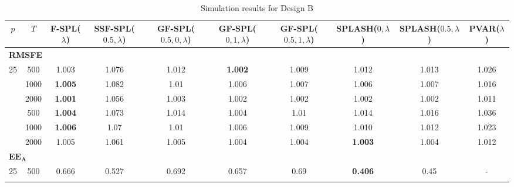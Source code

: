 \begin{landscape}
    \bgroup
    \def\arraystretch{1.3}
    \begin{table}[p]
    \footnotesize
    \centering
    \caption{Simulation results for Design B}
    \label{tab:results_designB}
    \begin{tabular}{cccccccccc}    
    \hline \hline
    $p$  &  $T$   &  F-SPL($\lambda$)  & SSF-SPL($0.5, \lambda$)  &  GF-SPL($0.5, 0, \lambda$)  &  GF-SPL($0, 1, \lambda$)  &  GF-SPL($0.5, 1, \lambda$)  &  SPLASH($0, \lambda$)  &  SPLASH($0.5, \lambda$)  &  PVAR($\lambda$)  \\
    \hline
    \multicolumn{10}{l}{\textbf{RMSFE}} \\
	\hline
	 25  & 500  & 1.003              &           1.076           &            1.012            & \textbf{1.002}            &            1.009            & 1.012                  &          1.013           &       1.026       \\ \hdashline
	 25  & 1000 & \textbf{1.005}     &           1.082           &            1.01             & 1.006                     &            1.007            & 1.006                  &          1.007           &       1.016       \\ \hdashline
	 25  & 2000 & \textbf{1.001}     &           1.056           &            1.003            & 1.002                     &            1.002            & 1.002                  &          1.002           &       1.011       \\ \hdashline
	 36  & 500  & \textbf{1.004}     &           1.073           &            1.014            & 1.004                     &            1.01             & 1.014                  &          1.016           &       1.036       \\ \hdashline
	 36  & 1000 & \textbf{1.006}     &           1.07            &            1.01             & 1.006                     &            1.009            & 1.010                  &          1.012           &       1.023       \\ \hdashline
	 36  & 2000 & 1.005              &           1.061           &            1.005            & 1.004                     &            1.004            & \textbf{1.003}         &          1.004           &       1.012       \\
	\hline
	\multicolumn{10}{l}{$\mathbf{EE_A}$} \\
	\hline
	 25  & 500  &       0.666        &           0.527           &            0.692            &           0.657           &            0.69             & \textbf{0.406}         &           0.45           & -                 \\ \hdashline

\end{tabular}
\end{table}
\end{landscape}
